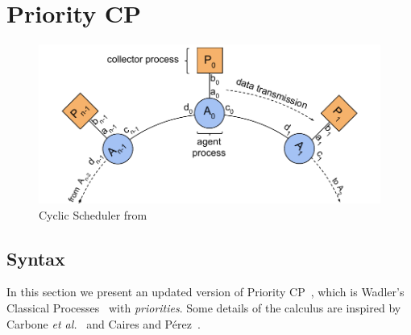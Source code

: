 \documentclass[main.tex]{subfiles}
\begin{document}
\section{Priority CP}

\begin{figure}[t]
  \centering
  \includegraphics[width=0.8\columnwidth]{scheduler}
  \vspace{-4mm}
  \caption{Cyclic Scheduler from \cite{DardhaG18}}
  \label{fig:scheduler}
  \vspace{-4mm}
  \end{figure}

\subsection{Syntax}

In this section we present an updated version of Priority CP~\cite{DardhaG18}, which is Wadler's Classical Processes~\cite{W12} with \emph{priorities}. Some details of the calculus are inspired by Carbone \emph{et al.}~\cite{CLMSW16} and Caires and P\'{e}rez~\cite{CP17}.
\end{document}
